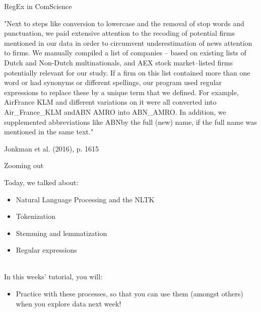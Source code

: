 \documentclass[handout]{beamer}
\begin{document}
\begin{frame}[fragile]{RegEx in ComScience}

\begin{small}
"Next to steps like conversion to lowercase and the removal of stop words and punctuation, we paid extensive attention to the recoding of potential firms mentioned in our data in order to circumvent underestimation of news attention to firms. We manually compiled a list of companies – based on existing lists of Dutch and Non-Dutch multinationals, and AEX stock market–listed firms potentially relevant for our study. If a firm on this list contained more than one word or had synonyms or different spellings, our program used regular expressions to replace these by a unique term that we defined. For example, AirFrance KLM and different variations on it were all converted into Air\_France\_KLM andABN AMRO into ABN\_AMRO. In addition, we supplemented abbreviations like ABNby the full (new) name, if the full name was mentioned in the same text."
\end{small}
\begin{tiny}
Jonkman et al. (2016), p. 1615 
\end{tiny}

\end{frame}


\begin{frame}{Zooming out} 
	
Today, we talked about:
\begin{itemize}
	\item Natural Language Processing and the NLTK
	\item Tokenization
	\item Stemming and lemmatization
	\item Regular expressions \\\
\end{itemize}
	
In this weeks' tutorial, you will:
\begin{itemize}
	\item Practice with these processes, so that you can use them (amongst others) when you explore data next week!
\end{itemize}
	
\end{frame}
\end{document}
